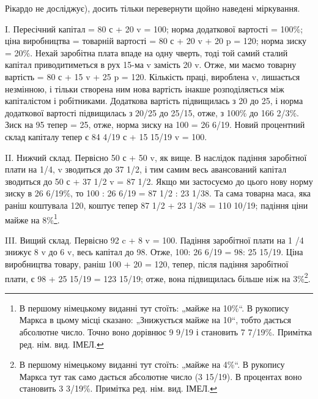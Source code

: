 \parcont{}  %
Рікардо не досліджує), досить тільки перевернути щойно наведені
міркування.

I. Пересічний капітал = 80 с + 20 v = 100; норма додаткової
вартості = 100\%; ціна виробництва = товарній вартості = 80 с +
20 v + 20 p = 120; норма зиску = 20\%. Нехай заробітна плата
впаде на одну чверть, тоді той самий сталий капітал приводитиметься
в рух 15-ма v замість 20 v. Отже, ми маємо товарну
вартість = 80 с + 15 v + 25 p = 120. Кількість праці, вироблена v,
лишається  незмінною, і тільки створена ним нова вартість інакше
розподіляється між капіталістом і робітниками. Додаткова вартість
підвищилась з 20 до 25, і норма додаткової вартості
підвищилась з 20/25 до 25/15, отже, з 100\% до 166 2/3\%. Зиск на 95 тепер = 25,
отже, норма зиску на 100 = 26 6/19. Новий процентний склад
капіталу тепер є 84 4/19 с + 15 15/19 v = 100.

II. Нижчий склад. Первісно 50 с + 50 v, як вище. В наслідок
падіння заробітної плати на 1/4, v зводиться до 37 1/2, і тим самим
весь авансований капітал зводиться до 50 с + 37 1/2 v = 87 1/2. Якщо
ми застосуємо до цього нову норму зиску в 26 6/19\%, то
100 : 26 6/19 = 87 1/2 : 23 1/38. Та сама товарна маса, яка раніш коштувала
120, коштує тепер 87 1/2 + 23 1/38 = 110 10/19; падіння ціни майже на 8\%\footnote*{
В першому німецькому виданні тут стоїть: „майже на 10\%“. В рукопису
Маркса в цьому місці сказано: „Знижується майже на 10“, тобто дається абсолютне число. Точно воно
дорівнює 9 9/19 і становить 7 7/19\%. Примітка ред. нім. вид. ІМЕЛ.
}.

III. Вищий склад. Первісно 92 c + 8 v = 100. Падіння заробітної
плати на 1 /4 знижує 8 v до 6 v, весь капітал до 98. Отже,
100: 26 6/19 = 98: 25 15/19. Ціна виробництва товару, раніш 100 + 20 = 120,
тепер, після падіння заробітної плати, є 98 + 25 15/19 = 123 15/19;
отже, вона підвищилась більше ніж на 3\%\footnote*{
В першому німецькому виданні тут стоїть: „майже на 4\%“. В рукопису
Маркса тут так само дається абсолютне число (3 15/19). В процентах воно становить
3 3/19\%. Примітка ред. нім. вид. ІМЕЛ.
}.


